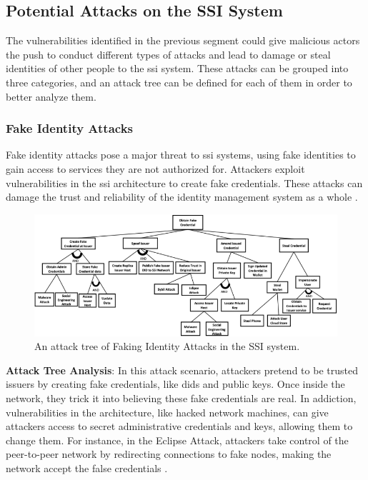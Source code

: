 \subsection{Potential Attacks on the SSI System}

The vulnerabilities identified in the previous segment could give malicious actors the push to conduct different types of attacks and lead to damage or steal identities of other 
people to the \gls{ssi} system. These attacks can be grouped into three categories, and an attack tree can be defined for each of them in order to better analyze them.

\subsubsection{Fake Identity Attacks}

Fake identity attacks pose a major threat to \gls{ssi} systems, using fake identities to gain access to services they are not authorized for. Attackers exploit vulnerabilities in 
the \gls{ssi} architecture to create fake credentials. These attacks can damage the trust and reliability of the identity management system as a whole \cite{CyberSecurity}.

\begin{figure}[h]  
  \centering
  \includegraphics[width=1\textwidth]{Images/c5_4.png} 
  \caption{An attack tree of Faking Identity Attacks in the SSI system.}
\end{figure}

\newpage

\textbf{Attack Tree Analysis}: In this attack scenario, attackers pretend to be trusted issuers by creating fake credentials, like \gls{did}s and public keys. Once inside the 
network, they trick it into believing these fake credentials are real. In addiction, vulnerabilities in the architecture, like hacked network machines, can give attackers 
access to secret administrative credentials and keys, allowing them to change them. For instance, in the Eclipse Attack, attackers take control of the peer-to-peer network 
by redirecting connections to fake nodes, making the network accept the false credentials \cite{9659929}.

